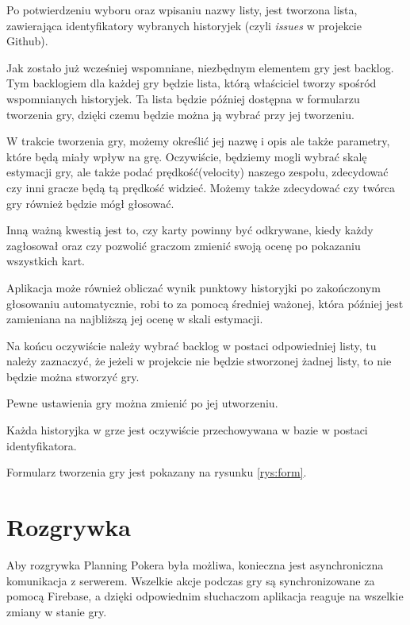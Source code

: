 Po potwierdzeniu wyboru oraz wpisaniu nazwy listy, jest tworzona lista, zawierająca
identyfikatory wybranych historyjek (czyli \textit{issues} w projekcie Github).

Jak zostało już wcześniej wspomniane, niezbędnym elementem gry jest backlog.
Tym backlogiem dla każdej gry będzie lista, którą właściciel tworzy spośród wspomnianych historyjek.
Ta lista będzie później dostępna w formularzu tworzenia gry,
dzięki czemu będzie można ją wybrać przy jej tworzeniu.

W trakcie tworzenia gry, możemy określić jej nazwę i opis ale także parametry, które będą miały wpływ na grę.
Oczywiście, będziemy mogli wybrać skalę estymacji gry, ale także podać prędkość(velocity) naszego zespołu,
zdecydować czy inni gracze będą tą prędkość widzieć.
Możemy także zdecydować czy twórca gry również będzie mógł głosować.

Inną ważną kwestią jest to, czy karty powinny być odkrywane, kiedy każdy zagłosował
oraz czy pozwolić graczom zmienić swoją ocenę po pokazaniu wszystkich kart.

Aplikacja może również obliczać wynik punktowy historyjki po zakończonym głosowaniu automatycznie,
robi to za pomocą średniej ważonej, która później jest zamieniana na najbliższą jej ocenę w skali estymacji.

Na końcu oczywiście należy wybrać backlog w postaci odpowiedniej listy, tu należy zaznaczyć,
że jeżeli w projekcie nie będzie stworzonej żadnej listy, to nie będzie można stworzyć gry.

Pewne ustawienia gry można zmienić po jej utworzeniu.

Każda historyjka w grze jest oczywiście przechowywana w bazie w postaci identyfikatora.

Formularz tworzenia gry jest pokazany na rysunku \ref{rys:form}.

\section{Rozgrywka}

Aby rozgrywka Planning Pokera była możliwa,
konieczna jest asynchroniczna komunikacja z serwerem.
Wszelkie akcje podczas gry są synchronizowane za pomocą Firebase,
a dzięki odpowiednim słuchaczom aplikacja reaguje na wszelkie zmiany w stanie gry.

